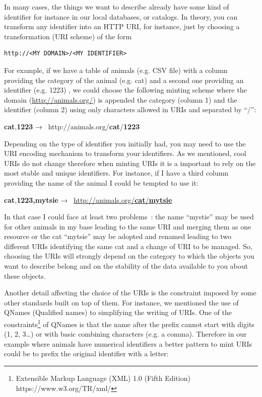 In many cases, the things we want to describe already have some kind of
identifier for instance in our local databases, or catalogs. In theory,
you can transform any identifier into an HTTP URI, for instance, just by
choosing a transformation (URI scheme) of the form

\begin{lstlisting}
http://<MY DOMAIN>/<MY IDENTIFIER>
\end{lstlisting}


For example, if we have a table of animals (e.g. CSV file) with a column
providing the category of the animal (e.g. cat) and a second one
providing an identifier (e.g. 1223) , we could choose the following
minting scheme where the domain (\url{http://animals.org/}) is appended
the category (column 1) and the identifier (column 2) using only
characters allowed in URIs and separated by ``/'':

\textbf{cat},\textbf{1223} →~
http://animals.org/\textbf{cat}/\textbf{1223}

Depending on the type of identifier you initially had, you may need to
use the URI encoding mechanism to transform your identifiers. As we
mentioned, cool URIs do not change therefore when minting URIs it is a
important to rely on the most stable and unique identifiers. For
instance, if I have a third column providing the name of the animal I
could be tempted to use it:

\textbf{cat},\textbf{1223,mytsie} →~
\href{http://animals.org/cat/mytsie}{http://animals.org/\textbf{cat}/\textbf{mytsie}}

In that case I could face at least two problems~: the name ``mystie''
may be used for other animals in my base leading to the same URI and
merging them as one resource or the cat ``mytsie'' may be adopted and
renamed leading to two different URIs identifying the same cat and a
change of URI to be managed. So, choosing the URIs will strongly depend
on the category to which the objects you want to describe belong and on
the stability of the data available to you about these objects.

Another detail affecting the choice of the URIs is the constraint
imposed by some other standards built on top of them. For instance, we
mentioned the use of QNames (Qualified names) to simplifying the writing
of URIs. One of the constraints\footnote{Extensible Markup Language
  (XML) 1.0 (Fifth Edition) https://www.w3.org/TR/xml/} of QNames is
that the name after the prefix cannot start with digits (1, 2,
3\ldots{}) or with basic combining characters (e.g. a comma). Therefore
in our example where animals have numerical identifiers a better pattern
to mint URIs could be to prefix the original identifier with a letter:

